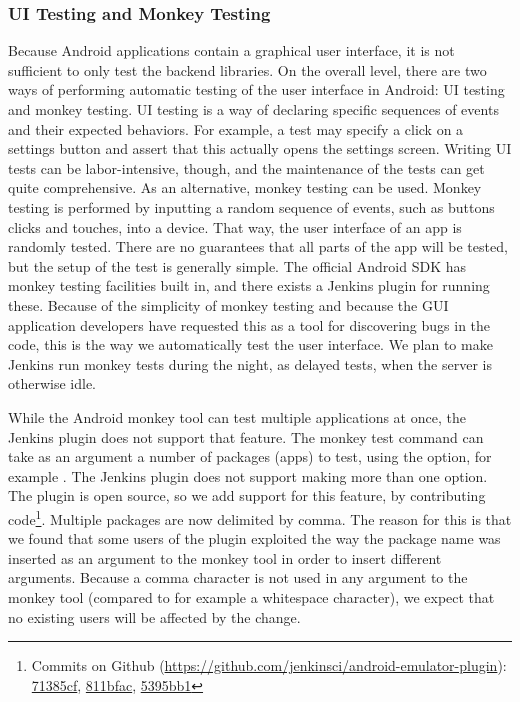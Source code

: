 \subsubsection{UI Testing and Monkey Testing}
Because Android applications contain a graphical user interface, it is not sufficient to only test the backend libraries. On the overall level, there are two ways of performing automatic testing of the user interface in Android: UI testing and monkey testing. UI testing is a way of declaring specific sequences of events and their expected behaviors. For example, a test may specify a click on a settings button and assert that this actually opens the settings screen. Writing UI tests can be labor-intensive, though, and the maintenance of the tests can get quite comprehensive. As an alternative, monkey testing can be used. Monkey testing is performed by inputting a random sequence of events, such as buttons clicks and touches, into a device. That way, the user interface of an app is randomly tested. There are no guarantees that all parts of the app will be tested, but the setup of the test is generally simple. The official Android SDK has monkey testing facilities built in, and there exists a Jenkins plugin for running these. Because of the simplicity of monkey testing and because the GUI application developers have requested this as a tool for discovering bugs in the code, this is the way we automatically test the user interface. We plan to make Jenkins run monkey tests during the night, as delayed tests, when the server is otherwise idle.

While the Android monkey tool can test multiple applications at once, the Jenkins plugin does not support that feature. The monkey test command can take as an argument a number of packages (apps) to test, using the  option, for example . The Jenkins plugin does not support making more than one  option. The plugin is open source, so we add support for this feature, by contributing code\footnote{Commits on Github (\url{https://github.com/jenkinsci/android-emulator-plugin}): \href{https://github.com/jenkinsci/android-emulator-plugin/commit/71385cfb3e3bb4dfa6d11170c52ee69808a4f72f}{71385cf},  \href{https://github.com/jenkinsci/android-emulator-plugin/commit/811bfac657565b25ce2f7fc9d6399d9f22bb6042}{811bfac}, \href{https://github.com/jenkinsci/android-emulator-plugin/commit/5395bb1fd23032cab48a7bfff61a26544f078785}{5395bb1}}. Multiple packages are now delimited by comma. The reason for this is that we found that some users of the plugin exploited the way the package name was inserted as an argument to the monkey tool in order to insert different arguments. Because a comma character is not used in any argument to the monkey tool (compared to for example a whitespace character), we expect that no existing users will be affected by the change.


